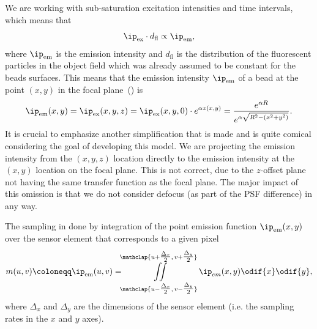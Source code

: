 We are working with sub-saturation excitation intensities and time intervals, which means that
    \begin{equation*}
        \ip_{\text{ex}}  \cdot d_{\text{fl}} \propto \ip_{\text{em}},
    \end{equation*}
    where \(\ip_{\text{em}}\) is the emission intensity and \(d_{\text{fl}}\) is the distribution of the
    fluorescent particles in the object field which was already assumed to be constant for the beads surfaces.
This means that the emission intensity \(\ip_{\text{em}}\) of a bead at the point \((x,y)\) in the focal 
    plane~() is
    \begin{equation*}
        \ip_{\text{em}}(x,y) = \ip_{\text{ex}}(x,y,z) = \ip_{\text{ex}}(x,y,0) \cdot e^{\alpha z(x,y)}
            = \frac{e^{\alpha R}}{ e^{\alpha\sqrt{R^2 - (x^2 + y^2)}}}.
    \end{equation*}
It is crucial to emphasize another simplification that is made and is quite comical considering the goal of developing
    this model.
We are projecting the emission intensity from the \((x,y,z)\) location directly to the emission intensity at the 
    \((x,y)\) location on the focal plane.
This is not correct, due to the \(z\)-offset plane not having the same transfer function as the focal plane.
The major impact of this omission is that we do not consider defocus (as part of the \ac{PSF} difference) in any way.

The sampling in done by integration of the point emission function \(\ip_{\text{em}}(x,y)\) over the sensor element that
    corresponds to a given pixel
    \begin{equation*}
        m(u,v) \coloneqq \ip_{\text{em}}(u,v) = \iint\limits_{\mathclap{u - \tfrac{\Delta_{x}}{2},\, v - \tfrac{\Delta_{y}}{2}}}^{\mathclap{u + \tfrac{\Delta_{x}}{2},\, v + \tfrac{\Delta_{y}}{2}}} \ip_{em}(x,y) \odif{x} \odif{y},
    \end{equation*}
    where \(\Delta_{x}\) and \(\Delta_{y}\) are the dimensions of the sensor element (i.e. the sampling rates in the
    \(x\) and \(y\) axes).

\begin{marginfigure}
    \caption{\ac{LR} and \ac{HR} bead models. The radius of the bead in the \ac{LR} sampling rate is \(\approx
        \qty{1.6}{\pixel\lowres}\), and for the \ac{HR} bead is is \(\approx\qty{3.2}{\pixel\highres}\).}
\end{marginfigure}
    

